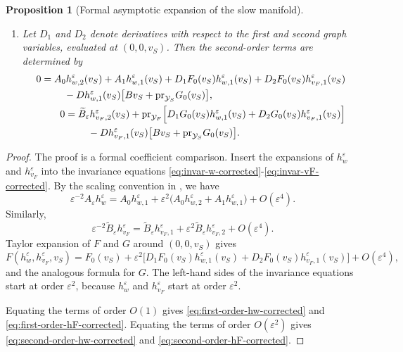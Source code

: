 \documentclass[11pt]{article}
\newtheorem{proposition}[theorem]{Proposition}
\theoremstyle{definition}
\theoremstyle{remark}
\numberwithin{equation}{section}
\newcommand{\mc}[1]{\mathcal{#1}}
\newcommand{\pr}{\textnormal{pr}}
\begin{document}
\begin{proposition}[Formal asymptotic expansion of the slow manifold]
\begin{enumerate}[label=\textup{(\roman*)},leftmargin=2.5em]
\item Let \(D_1\) and \(D_2\) denote derivatives with respect to the first
and second graph variables, evaluated at \((0,0,v_S)\). Then the second-order
terms are determined by
\begin{align}
\label{eq:second-order-hw-corrected}
\begin{split}
0={}&
A_0h_{w,2}^\varepsilon(v_S)
+
A_1h_{w,1}^\varepsilon(v_S)
+
D_1F_0(v_S)h_{w,1}^\varepsilon(v_S)
+
D_2F_0(v_S)h_{v_F,1}^\varepsilon(v_S)
\\
&\quad
-
Dh_{w,1}^\varepsilon(v_S)
\bigl[
Bv_S+\pr_{\mc Y_S}G_0(v_S)
\bigr],
\end{split}
\\
\label{eq:second-order-hF-corrected}
\begin{split}
0={}&
\widetilde B_\varepsilon h_{v_F,2}^\varepsilon(v_S)
+
\pr_{\mc Y_F}
\Big[
D_1G_0(v_S)h_{w,1}^\varepsilon(v_S)
+
D_2G_0(v_S)h_{v_F,1}^\varepsilon(v_S)
\Big]
\\
&\quad
-
Dh_{v_F,1}^\varepsilon(v_S)
\bigl[
Bv_S+\pr_{\mc Y_S}G_0(v_S)
\bigr].
\end{split}
\end{align}

\end{enumerate}
\end{proposition}

\begin{proof}
The proof is a formal coefficient comparison.
Insert the expansions of \(h_w^\varepsilon\) and
\(h_{v_F}^\varepsilon\) into the invariance equations
\eqref{eq:invar-w-corrected}-\eqref{eq:invar-vF-corrected}. By the scaling convention in ,
we have
\[
\varepsilon^{-2}A_\varepsilon h_w^\varepsilon
=
A_0h_{w,1}^\varepsilon
+
\varepsilon^2
\bigl(
A_0h_{w,2}^\varepsilon+A_1h_{w,1}^\varepsilon
\bigr)
+
O(\varepsilon^4).
\]
Similarly,
\[
\varepsilon^{-2}\widetilde B_\varepsilon h_{v_F}^\varepsilon
=
\widetilde B_\varepsilon h_{v_F,1}^\varepsilon
+
\varepsilon^2\widetilde B_\varepsilon h_{v_F,2}^\varepsilon
+
O(\varepsilon^4).
\]
Taylor expansion of \(F\) and \(G\) around \((0,0,v_S)\) gives
\[
F(h_w^\varepsilon,h_{v_F}^\varepsilon,v_S)
=
F_0(v_S)
+
\varepsilon^2
\Big[
D_1F_0(v_S)h_{w,1}^\varepsilon(v_S)
+
D_2F_0(v_S)h_{v_F,1}^\varepsilon(v_S)
\Big]
+
O(\varepsilon^4),
\]
and the analogous formula for \(G\). The left-hand sides of the invariance
equations start at order \(\varepsilon^2\), because
\(h_w^\varepsilon\) and \(h_{v_F}^\varepsilon\) start at order
\(\varepsilon^2\).

Equating the terms of order \(O(1)\) gives
\eqref{eq:first-order-hw-corrected} and
\eqref{eq:first-order-hF-corrected}. Equating the terms of order
\(O(\varepsilon^2)\) gives
\eqref{eq:second-order-hw-corrected} and
\eqref{eq:second-order-hF-corrected}.
\end{proof}
\end{document}
